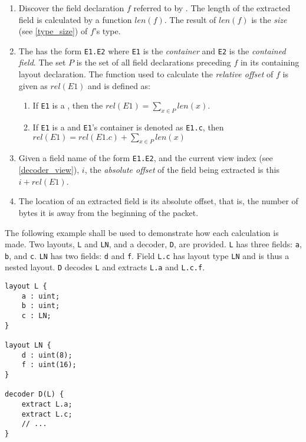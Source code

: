 \begin{enumerate}
\item Discover the field declaration $f$ referred to by . The length of the extracted field is calculated by a function $len(f)$. The result of $len(f)$ is the \textit{size} (see \ref{type_size}) of $f$'s type.

\item The  has the form \texttt{E1.E2} where \texttt{E1} is the \textit{container} and \texttt{E2} is the \textit{contained field}. The set $P$ is the set of all field declarations preceding $f$ in its containing layout declaration. The function used to calculate the \textit{relative offset} of $f$ is given as $rel(E1)$ and is defined as:

\begin{enumerate}

\item If \texttt{E1} is a , then the $rel(E1) = \sum_{x \in P}{} len(x)$.

\item If \texttt{E1} is a  and \texttt{E1}'s container is denoted as \texttt{E1.c}, then $rel(E1) = rel(E1.c) + \sum_{x \in P}{} len(x)$

\end{enumerate}

\item Given a field name of the form \texttt{E1.E2}, and the current view index (see \ref{decoder_view}), $i$, the \textit{absolute offset} of the field being extracted is this $i + rel(E1)$.

\item The location of an extracted field is its absolute offset, that is, the number of bytes it is away from the beginning of the packet.
\end{enumerate}

The following example shall be used to demonstrate how each calculation is made. Two layouts, \texttt{L} and \texttt{LN}, and a decoder, \texttt{D}, are provided. \texttt{L} has three fields: \texttt{a}, \texttt{b}, and \texttt{c}.  \texttt{LN} has two fields: \texttt{d} and \texttt{f}. Field \texttt{L.c} has layout type \texttt{LN} and is thus a nested layout. \texttt{D} decodes \texttt{L} and extracts \texttt{L.a} and \texttt{L.c.f}.

\begin{minip}
\begin{lstlisting}
layout L {
	a : uint;
	b : uint;
	c : LN;
}

layout LN {
	d : uint(8);
	f : uint(16);
}

decoder D(L) {
	extract L.a;
	extract L.c;
	// ...
}
\end{lstlisting}
\end{minip}

